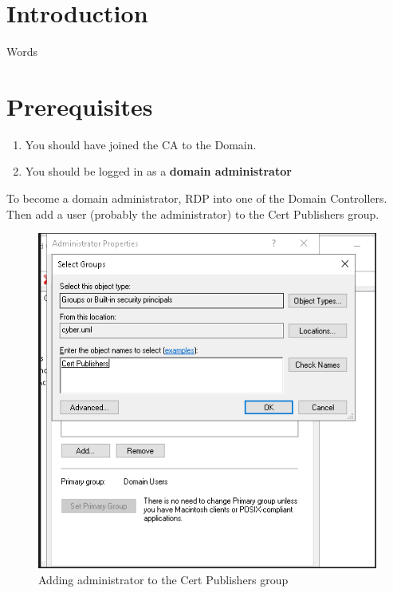 \documentclass{article}
\begin{document}
\graphicspath{ {./Images/} }
\tableofcontents

\section{Introduction}
Words

\section{Prerequisites}
\begin {enumerate}
\item You should have joined the CA to the Domain.
\item You should be logged in as a \textbf{domain administrator}
\end {enumerate}

To become a domain administrator, RDP into one of the Domain Controllers.
Then add a user (probably the administrator) to the Cert Publishers group.

\begin{figure}[H]
        \centering
        \includegraphics[width=1\textwidth]{AddingCertPublisherPermission.png}
        \caption{Adding administrator to the Cert Publishers group}
        \label{fig:AddingCertPublisherPermission}
\end{figure}
\end{document}
